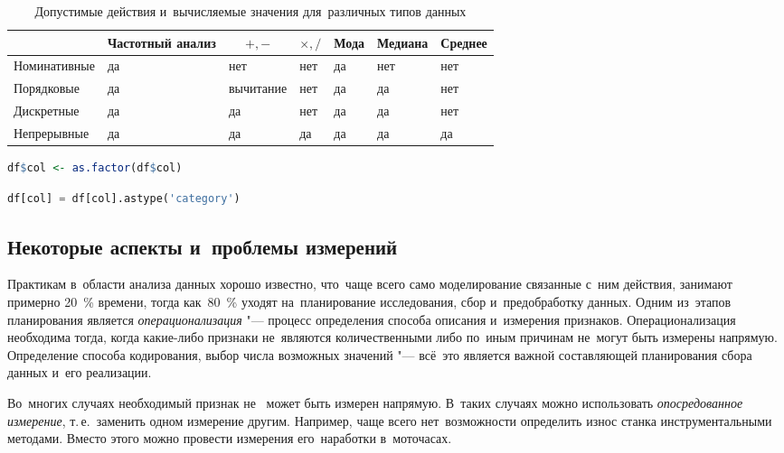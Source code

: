 \documentclass[]{scrartcl}
\begin{document}
\begin{table}[ht]
	\caption{Допустимые действия и~вычисляемые значения для~различных типов данных}  \label{tab:calculations-for-diff-data}
	\centering%
	\begin{tabularx}{\textwidth}{X|XXXXXX} 
		\hline
		\multicolumn{1}{c|}{} & \multicolumn{1}{c}{Частотный анализ} & \multicolumn{1}{c}{$+, - $} & \multicolumn{1}{c}{$\times, /$} & \multicolumn{1}{c}{Мода} & \multicolumn{1}{c}{Медиана} & \multicolumn{1}{c}{Среднее} \\
		\hline\hline
		Номинативные
		& да
		& нет
		& нет
		& да
		& нет
		& нет		
		\\ \hline
		Порядковые
		& да
		& вычитание
		& нет
		& да
		& да
		& нет
		\\ \hline
		Дискретные
		& да
		& да
		& нет
		& да
		& да
		& нет
		\\ \hline
		Непрерывные
		& да
		& да
		& да
		& да
		& да
		& да     
		\\ \hline
	\end{tabularx}
\end{table}

\begin{lstlisting}[float, caption = Преобразование переменной в~фактор на~языке R, firstnumber=1, language = R, label= listing-convert-to-factor-R-1]
df$col <- as.factor(df$col)
\end{lstlisting}

\begin{lstlisting}[float, caption = Преобразование переменной в~фактор на~языке Python, firstnumber=1, language = Python, label = listing-convert-to-factor-Python-1]
df[col] = df[col].astype('category')
\end{lstlisting}

\subsection{Некоторые аспекты и~проблемы измерений}
Практикам в~области анализа данных хорошо известно, что~чаще всего само моделирование связанные с~ним действия, занимают примерно 20~\% времени, тогда как~80~\% уходят на~планирование исследования, сбор и~предобработку данных. Одним из~этапов планирования является \emph{операционализация} "---  процесс определения способа описания и~измерения признаков. Операционализация необходима тогда, когда какие-либо признаки не~являются количественными либо по~иным причинам не~могут быть измерены напрямую. Определение способа кодирования, выбор числа возможных значений "--- всё~это является важной составляющей планирования сбора данных и~его реализации.
\par
Во~многих случаях необходимый признак не~ может быть измерен напрямую. В~таких случаях можно использовать \emph{опосредованное измерение}, т.\,е.~заменить одном измерение другим. Например, чаще всего нет~возможности определить износ станка инструментальными методами. Вместо этого можно провести измерения его~наработки в~моточасах.
\end{document}
